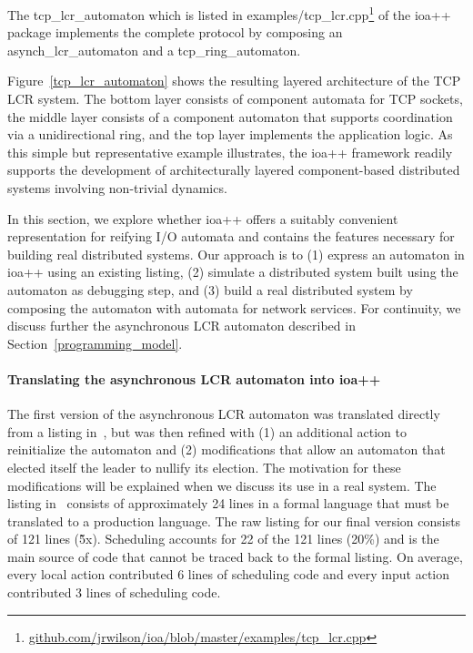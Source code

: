 The tcp\_lcr\_automaton which is listed in examples/tcp\_lcr.cpp\footnote{\url{github.com/jrwilson/ioa/blob/master/examples/tcp_lcr.cpp}} of the ioa++ package implements the complete protocol by composing an asynch\_lcr\_automaton and a tcp\_ring\_automaton.

Figure~\ref{tcp_lcr_automaton} shows the resulting layered architecture of the TCP LCR system.
The bottom layer consists of component automata for TCP sockets, the middle layer consists of a component automaton that supports coordination via a unidirectional ring, and the top layer implements the application logic.
As this simple but representative example illustrates, the ioa++ framework readily supports the development of architecturally layered component-based distributed systems involving non-trivial dynamics.


\ifjournal
In this section, we explore whether ioa++ offers a suitably convenient representation for reifying I/O automata and contains the features necessary for building real distributed systems.
Our approach is to (1) express an automaton in ioa++ using an existing listing, (2) simulate a distributed system built using the automaton as debugging step, and (3) build a real distributed system by composing the automaton with automata for network services.
For continuity, we discuss further the asynchronous LCR automaton described in Section~\ref{programming_model}.

\paragraph*{Translating the asynchronous LCR automaton into ioa++}
The first version of the asynchronous LCR automaton was translated directly from a listing in~\cite{lynch1996distributed}, but was then refined with (1) an additional action to reinitialize the automaton and (2) modifications that allow an automaton that elected itself the leader to nullify its election.
The motivation for these modifications will be explained when we discuss its use in a real system.
The listing in~\cite{lynch1996distributed} consists of approximately 24 lines in a formal language that must be translated to a production language.
The raw listing for our final version consists of 121 lines (\~5x).
Scheduling accounts for 22 of the 121 lines (20\%) and is the main source of code that cannot be traced back to the formal listing.
On average, every local action contributed 6 lines of scheduling code and every input action contributed 3 lines of scheduling code.

